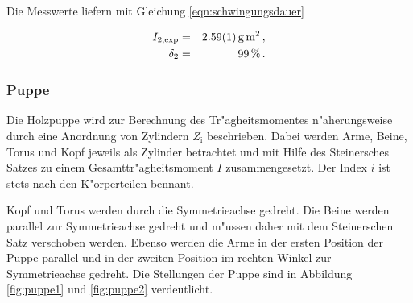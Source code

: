 				Die Messwerte liefern mit Gleichung \eqref{eqn:schwingungsdauer}

				\begin{eqnarray*}
					I_\mathrm{2, exp} & = & \SI{2.59 (1)}{\gram \meter \squared} \,, \\
					\delta_2 & = & \SI{99}{\percent} \,.
				\end{eqnarray*}

			\clearpage
			\subsubsection{Puppe}
			\label{subsubsec:puppe}
				Die Holzpuppe wird zur Berechnung des Tr"agheitsmomentes n"aherungsweise durch eine Anordnung von Zylindern $Z_\mathrm{i}$ beschrieben.
				Dabei werden Arme, Beine, Torus und Kopf jeweils als Zylinder betrachtet und mit Hilfe des Steinersches Satzes zu einem Gesamttr"agheitsmoment $I$ zusammengesetzt.
				Der Index $i$ ist stets nach den K"orperteilen bennant.

				Kopf und Torus werden durch die Symmetrieachse gedreht.
				Die Beine werden parallel zur Symmetrieachse gedreht und m"ussen daher mit dem Steinerschen Satz verschoben werden.
				Ebenso werden die Arme in der ersten Position der Puppe parallel und in der zweiten Position im rechten Winkel zur Symmetrieachse gedreht. Die Stellungen der Puppe sind in Abbildung \ref{fig:puppe1} und \ref{fig:puppe2} verdeutlicht.


